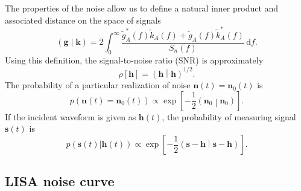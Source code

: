 \documentclass[useAMS,usedcolumn,usegraphicx,usenatbib]{mn2e}
\newcommand{\dd}{\ensuremath{\mathrm{d}}}
\newcommand{\intd}[4]{\ensuremath{\int_{#1}^{#2}{#3}\,\dd{#4}}}
\newcommand{\recip}[1]{\ensuremath{\frac{1}{#1}}}
\newcommand{\innerprod}[2]{\ensuremath{\left({#1}\middle|{#2}\right)}}
\begin{document}
The properties of the noise allow us to define a natural inner product and associated distance on the space of signals \citep{Cutler1994}
\begin{equation}
\innerprod{\boldsymbol{g}}{\boldsymbol{k}} = 2\intd{0}{\infty}{\frac{\tilde{g}_A^*(f)\tilde{k}_A(f) + \tilde{g}_A(f)\tilde{k}_A^*(f)}{S_n(f)}}{f}.
\label{eq:inner}
\end{equation}
Using this definition, the signal-to-noise ratio (SNR) is approximately
\begin{equation}
\rho[\boldsymbol{h}] = \innerprod{\boldsymbol{h}}{\boldsymbol{h}}^{1/2}.
\label{eq:SNR}
\end{equation}
The probability of a particular realization of noise $\boldsymbol{n}(t) = \boldsymbol{n}_0(t)$ is
\begin{equation}
p(\boldsymbol{n}(t) = \boldsymbol{n}_0(t)) \propto \exp\left[-\recip{2}\innerprod{\boldsymbol{n}_0}{\boldsymbol{n}_0}\right].
\end{equation}
If the incident waveform is given as $\boldsymbol{h}(t)$, the probability of measuring signal $\boldsymbol{s}(t)$ is
\begin{equation}
p(\boldsymbol{s}(t)|\boldsymbol{h}(t)) \propto \exp\left[-\recip{2}\innerprod{\boldsymbol{s}-\boldsymbol{h}}{\boldsymbol{s}-\boldsymbol{h}}\right].
\label{eq:sig_prob}
\end{equation}

\subsection{LISA noise curve}\label{sec:Noise}
\end{document}

